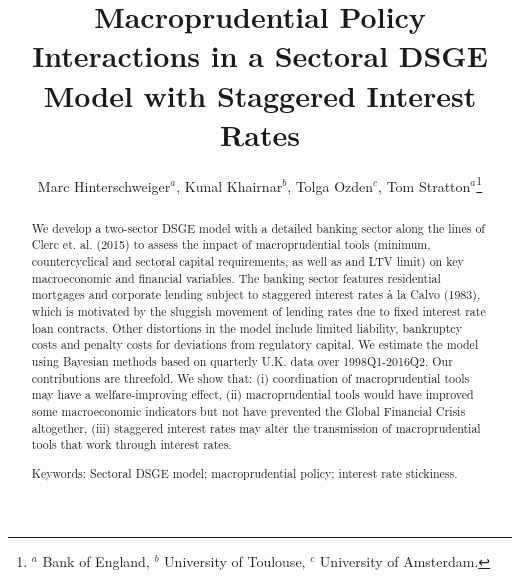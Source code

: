 \documentclass[12pt]{article}
\title{Macroprudential Policy Interactions in a Sectoral DSGE Model with Staggered Interest Rates}
\author{Marc Hinterschweiger$^{a}$, Kunal Khairnar$^{b}$, Tolga Ozden$^{c}$, Tom Stratton$^{a}$\footnote{$^{a}$ Bank of England, $^{b}$ University of Toulouse, $^{c}$ University of Amsterdam.}}
\numberwithin{equation}{section}
\begin{document}
\maketitle



\begin{abstract}

We develop a two-sector DSGE model with a detailed banking sector along the lines of Clerc et. al. (2015) to assess the impact of macroprudential tools (minimum, countercyclical and sectoral capital requirements, as well as and LTV limit) on key macroeconomic and financial variables. The banking sector features residential mortgages and corporate lending subject to staggered interest rates à la Calvo (1983), which is motivated by the sluggish movement of lending rates due to fixed interest rate loan contracts. Other distortions in the model include limited liability, bankruptcy costs and penalty costs for deviations from regulatory capital. We estimate the model using Bayesian methods based on quarterly U.K. data over 1998Q1-2016Q2. Our contributions are threefold. We show that: (i) coordination of macroprudential tools may have a welfare-improving effect, (ii) macroprudential tools would have improved some macroeconomic indicators but not have prevented the Global Financial Crisis altogether, (iii) staggered interest rates may alter the transmission of macroprudential tools that work through interest rates. 

\noindent

\vspace{3 mm}
Keywords: Sectoral DSGE model; macroprudential policy; interest rate stickiness. \\
\noindent 


	
\end{abstract}
\noindent\vspace{3 mm}
\end{document}

